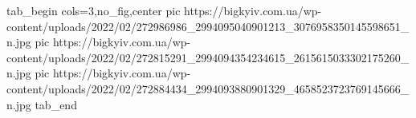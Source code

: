  
 
 
 
 


\ifcmt
  tab_begin cols=3,no_fig,center
     pic https://bigkyiv.com.ua/wp-content/uploads/2022/02/272986986_2994095040901213_3076958350145598651_n.jpg
		 pic https://bigkyiv.com.ua/wp-content/uploads/2022/02/272815291_2994094354234615_2615615033302175260_n.jpg
		 pic https://bigkyiv.com.ua/wp-content/uploads/2022/02/272884434_2994093880901329_4658523723769145666_n.jpg
  tab_end
\fi
